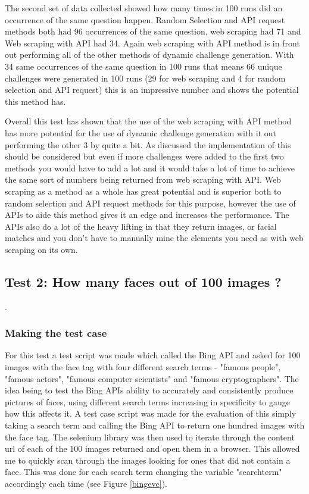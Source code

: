 \documentclass[12pt,a4paper]{article}
\begin{document}
The second set of data collected showed how many times in 100 runs did an occurrence of the same question happen. Random Selection and API request methods both had 96 occurrences of the same question, web scraping had 71 and Web scraping with API had 34. Again web scraping with API method is in front out performing all of the other methods of dynamic challenge generation. With 34 same occurrences of the same question in 100 runs that means 66 unique challenges were generated in 100 runs (29 for web scraping and 4 for random selection and API request) this is an impressive number and shows the potential this method has. 

Overall this test has shown that the use of the web scraping with API method has more potential for the use of dynamic challenge generation with it out performing the other 3 by quite a bit. As discussed the implementation of this should be considered but even if more challenges were added to the first two methods you would have to add a lot and it would take a lot of time to achieve the same sort of numbers being returned from web scraping with API. Web scraping as a method as a whole has great potential and is superior both to random selection and API request methods for this purpose, however the use of APIs to aide this method gives it an edge and increases the performance. The APIs also do a lot of the heavy lifting in that they return images, or facial matches and you don't have to manually mine the elements you need as with web scraping on its own.

\subsection{Test 2: How many faces out of 100 images ?}.   
\subsubsection{Making the test case}
For this test a test script was made which called the Bing API and asked for 100 images with the face tag with four different search terms - "famous people", "famous actors", "famous computer scientists" and "famous cryptographers". The idea being to test the Bing APIs ability to accurately and consistently produce pictures of faces, using different search terms increasing in specificity to gauge how this affects it. A test case script was made for the evaluation of this simply taking a search term and calling the Bing API to return one hundred images with the face tag. The selenium library was then used to iterate through the content url of each of the 100 images returned and open them in a browser. This allowed me to quickly scan through the images looking for ones that did not contain a face. This was done for each search term changing the variable "search\textunderscore term" accordingly each time (see Figure \ref{bingevc}).  
\end{document}

